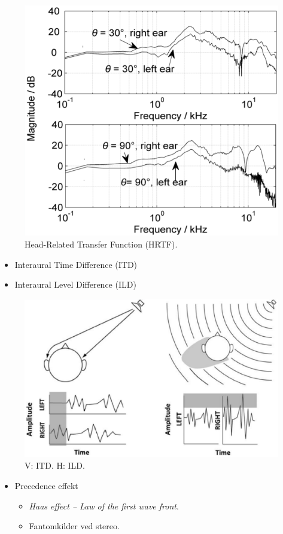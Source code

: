 \begin{figure} [H]
	\centering
	\includegraphics[width=.7\linewidth]{graphics/48.png}
	\caption{Head-Related Transfer Function (HRTF).}
	\label{fig:48}
\end{figure}

\begin{itemize}
	\item Interaural Time Difference (ITD) 
	\item Interaural Level Difference (ILD)
\end{itemize}


\begin{figure} [H]
	\centering
	\includegraphics[width=.7\linewidth]{graphics/47.png}
	\caption{V: ITD. H: ILD.}
	\label{fig:47}
\end{figure}
\newpage
\begin{itemize}
	\item Precedence effekt
	\begin{itemize}
		\item \textit{Haas effect – Law of the first wave front}.
		\item Fantomkilder ved stereo.
	\end{itemize}
\end{itemize}

